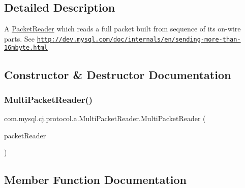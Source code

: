 \subsection{Detailed Description}
A \mbox{\hyperlink{}{Packet\+Reader}} which reads a full packet built from sequence of it\textquotesingle{}s on-\/wire parts. See \href{http://dev.mysql.com/doc/internals/en/sending-more-than-16mbyte.html}{\tt http\+://dev.\+mysql.\+com/doc/internals/en/sending-\/more-\/than-\/16mbyte.\+html} 

\subsection{Constructor \& Destructor Documentation}
\mbox{\label{classcom_1_1mysql_1_1cj_1_1protocol_1_1a_1_1_multi_packet_reader_a73909539b9b69319ac63a6e29f2f1088}} 
\subsubsection{\texorpdfstring{Multi\+Packet\+Reader()}{MultiPacketReader()}}
{\footnotesize\ttfamily com.\+mysql.\+cj.\+protocol.\+a.\+Multi\+Packet\+Reader.\+Multi\+Packet\+Reader (\begin{DoxyParamCaption}\item[{\mbox{\hyperlink{interfacecom_1_1mysql_1_1cj_1_1protocol_1_1_message_reader}{Message\+Reader}}$<$ \mbox{\hyperlink{classcom_1_1mysql_1_1cj_1_1protocol_1_1a_1_1_native_packet_header}{Native\+Packet\+Header}}, \mbox{\hyperlink{classcom_1_1mysql_1_1cj_1_1protocol_1_1a_1_1_native_packet_payload}{Native\+Packet\+Payload}} $>$}]{packet\+Reader }\end{DoxyParamCaption})}



\subsection{Member Function Documentation}
\mbox{\label{classcom_1_1mysql_1_1cj_1_1protocol_1_1a_1_1_multi_packet_reader_a237c52b4c174c917ec8a15a5eb2839d1}} 
